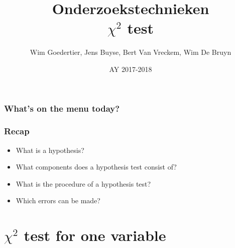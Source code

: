 \documentclass{beamer}
\title[Intro]{Onderzoekstechnieken\\$\chi^{2}$ test}
\author{Wim Goedertier, Jens Buyse, Bert {Van Vreckem}, Wim {De Bruyn}}
\date{AY 2017-2018}
\begin{document}

\HoGentLogo

\titleframe





\begin{frame}
  \frametitle{What's on the menu today?}

  \tableofcontents
\end{frame}

\begin{frame}
  \frametitle{Recap}

  \begin{itemize}
    \item What is a hypothesis?
    \item What components does a hypothesis test consist of?
    \item What is the procedure of a hypothesis test?
    \item Which errors can be made?
  \end{itemize}
\end{frame}

\section{$\chi^{2}$ test for one variable}
\sectionframelogo{}
\end{document}
